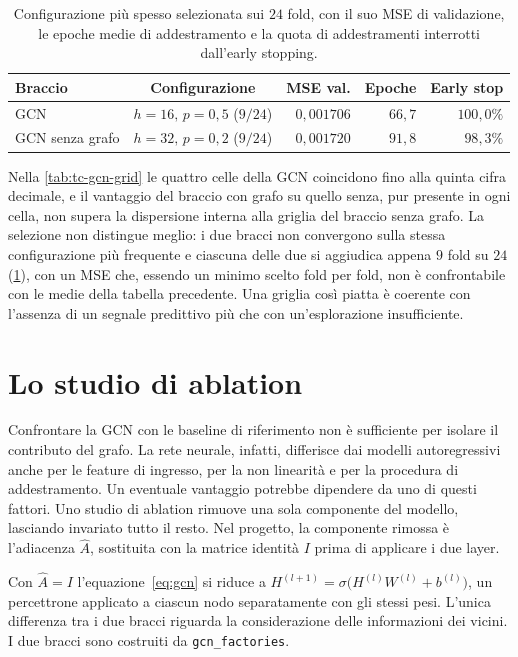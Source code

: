\begin{table}[H]
\centering
\caption[Esito della selezione sulla griglia GCN]{Configurazione più spesso selezionata sui $24$ fold, con il suo MSE di validazione, le epoche medie di addestramento e la quota di addestramenti interrotti dall'early stopping.}
\label{tab:tc-gcn-selection}
\small
\begin{tabular*}{\textwidth}{@{\extracolsep{\fill}}lcrrr@{}}
\toprule
\textbf{Braccio} & \textbf{Configurazione} & \textbf{MSE val.} & \textbf{Epoche} & \textbf{Early stop} \\
\midrule
GCN & $h{=}16,\,p{=}0{,}5$ ($9/24$) & $0{,}001706$ & $66{,}7$ & $100{,}0\%$ \\
GCN senza grafo & $h{=}32,\,p{=}0{,}2$ ($9/24$) & $0{,}001720$ & $91{,}8$ & $98{,}3\%$ \\
\bottomrule
\end{tabular*}
\end{table}

Nella \cref{tab:tc-gcn-grid} le quattro celle della GCN coincidono fino alla quinta cifra decimale, e il vantaggio del braccio con grafo su quello senza, pur presente in ogni cella, non supera la dispersione interna alla griglia del braccio senza grafo. La selezione non distingue meglio: i due bracci non convergono sulla stessa configurazione più frequente e ciascuna delle due si aggiudica appena $9$ fold su $24$ (\cref{tab:tc-gcn-selection}), con un MSE che, essendo un minimo scelto fold per fold, non è confrontabile con le medie della tabella precedente. Una griglia così piatta è coerente con l'assenza di un segnale predittivo più che con un'esplorazione insufficiente.

\section{Lo studio di ablation}
\label{sec:tc-ablation}

Confrontare la GCN con le baseline di riferimento non è sufficiente per isolare il contributo del grafo. La rete neurale, infatti, differisce dai modelli autoregressivi anche per le feature di ingresso, per la non linearità e per la procedura di addestramento. Un eventuale vantaggio potrebbe dipendere da uno di questi fattori. Uno studio di ablation rimuove una sola componente del modello, lasciando invariato tutto il resto. Nel progetto, la componente rimossa è l'adiacenza $\hat A$, sostituita con la matrice identità $I$ prima di applicare i due layer.

Con $\hat A=I$ l'equazione~\eqref{eq:gcn} si riduce a $H^{(l+1)}=\sigma\bigl(H^{(l)}W^{(l)}+b^{(l)}\bigr)$, un percettrone applicato a ciascun nodo separatamente con gli stessi pesi. L'unica differenza tra i due bracci riguarda la considerazione delle informazioni dei vicini. I due bracci sono costruiti da \texttt{gcn\_factories}.

